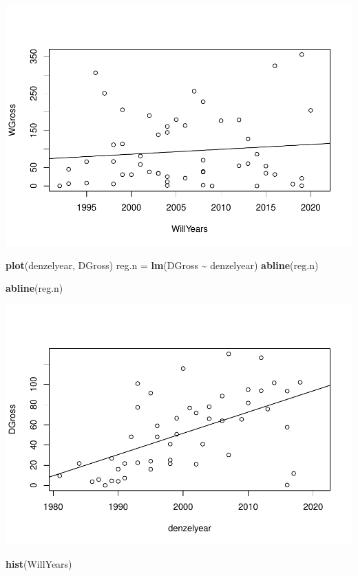 \documentclass[]{article}
\newenvironment{Shaded}{\begin{snugshade}}{\end{snugshade}}
\newcommand{\KeywordTok}[1]{\textcolor[rgb]{0.13,0.29,0.53}{\textbf{#1}}}
\newcommand{\NormalTok}[1]{#1}
\newcommand{\OperatorTok}[1]{\textcolor[rgb]{0.81,0.36,0.00}{\textbf{#1}}}
\newcommand{\StringTok}[1]{\textcolor[rgb]{0.31,0.60,0.02}{#1}}
\begin{document}
\includegraphics{Denzel-v-Will-data_files/figure-latex/unnamed-chunk-7-1.pdf}

\begin{Shaded}
\begin{Highlighting}[]
\KeywordTok{plot}\NormalTok{(denzelyear, DGross)}
\NormalTok{reg.n =}\StringTok{ }\KeywordTok{lm}\NormalTok{(DGross }\OperatorTok{\textasciitilde{}}\StringTok{ }\NormalTok{denzelyear)}
\KeywordTok{abline}\NormalTok{(reg.n)}

\KeywordTok{abline}\NormalTok{(reg.n)}
\end{Highlighting}
\end{Shaded}

\includegraphics{Denzel-v-Will-data_files/figure-latex/unnamed-chunk-7-2.pdf}

\begin{Shaded}
\begin{Highlighting}[]
\KeywordTok{hist}\NormalTok{(WillYears)}
\end{Highlighting}
\end{Shaded}
\end{document}
